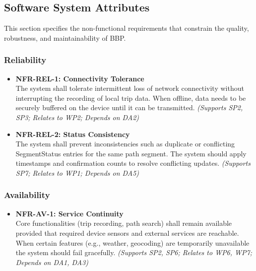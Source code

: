 \subsection{Software System Attributes}
\label{sec:system_attributes}

This section specifies the non-functional requirements that constrain the quality, robustness, and maintainability of BBP.

\subsubsection*{Reliability}

\begin{itemize}

    \item \textbf{NFR-REL-1: Connectivity Tolerance}
    \label{req:NFR-REL-1}\\
    The system shall tolerate intermittent loss of network connectivity without interrupting the recording of local trip data. When offline, data needs to be securely buffered on the device until it can be transmitted.
    \textit{(Supports SP2, SP3; Relates to WP2; Depends on DA2)}

    \item \textbf{NFR-REL-2: Status Consistency}
    \label{req:NFR-REL-2}\\
    The system shall prevent inconsistencies such as duplicate or conflicting SegmentStatus entries for the same path segment. The system should apply timestamps and confirmation counts to resolve conflicting updates.
    \textit{(Supports SP7; Relates to WP1; Depends on DA5)}

\end{itemize}

\subsubsection*{Availability}

\begin{itemize}

    \item \textbf{NFR-AV-1: Service Continuity}
    \label{req:NFR-AV-1}\\
    Core functionalities (trip recording, path search) shall remain available provided that required device sensors and external services are reachable. When certain features (e.g., weather, geocoding) are temporarily unavailable the system should fail gracefully.
    \textit{(Supports SP2, SP6; Relates to WP6, WP7; Depends on DA1, DA3)}

\end{itemize}

